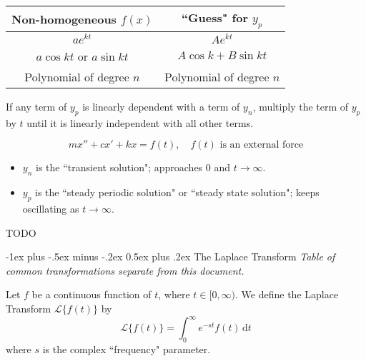 \documentclass[10pt,landscape,letterpaper]{article}
\makeatletter
\renewcommand{\section}{\@startsection{section}{1}{0mm}%
                                {-1ex plus -.5ex minus -.2ex}%
                                {0.5ex plus .2ex}%
                                {\normalfont\large\bfseries}}
\newcommand\cheatsheetmargin{0.2cm}
\makeatother
\begin{document}
\begin{multicols}{3}
\begin{minipage}{\columnwidth}
\begin{description}[style=unboxed,leftmargin=\cheatsheetmargin]
    \renewcommand{\arraystretch}{1.5}
    \item \begin{tabular}{|c|c|}
        \hline
        \textbf{Non-homogeneous $f(x)$} & \textbf{``Guess" for $y_p$} \\
        \hline
        $ae^{kt}$ & $Ae^{kt}$ \\
        $a\cos k t$ or $a\sin k t$ &  $A\cos k + B\sin k t$ \\
        Polynomial of degree $n$ & Polynomial of degree $n$ \\
        \hline
    \end{tabular}
    \item[Important:]
        If any term of $y_p$ is linearly dependent with a term of $y_n$, multiply the term of $y_p$ by $t$ until it is linearly independent with all other terms.
   \item[Forced Mechanical Vibrations]
   \begin{equation*}
   mx'' + cx' + kx = f(t), \quad f(t) \text{ is an external force}
   \end{equation*}
   \begin{itemize}
       \item$y_n$ is the ``transient solution"; approaches 0 and $t \to \infty$.
       \item$y_p$ is the ``steady periodic solution" or ``steady state solution"; keeps oscillating as $t\to \infty$.
   \end{itemize}
    \item[Resonance] TODO
\end{description}


\section{The Laplace Transform}
\textit{\scriptsize * Table of common transformations separate from this document.}

Let $f$ be a continuous function of $t$, where $t \in [0, \infty)$. We define the Laplace Transform $\mathcal L\{f(t)\}$ by
\begin{equation*}
\mathcal L\{f(t)\} = \int_0^\infty e^{-st} f(t) \, \mathrm dt
\end{equation*}
where $s$ is the complex ``frequency" parameter.


\end{minipage}
\end{multicols}
\end{document}
